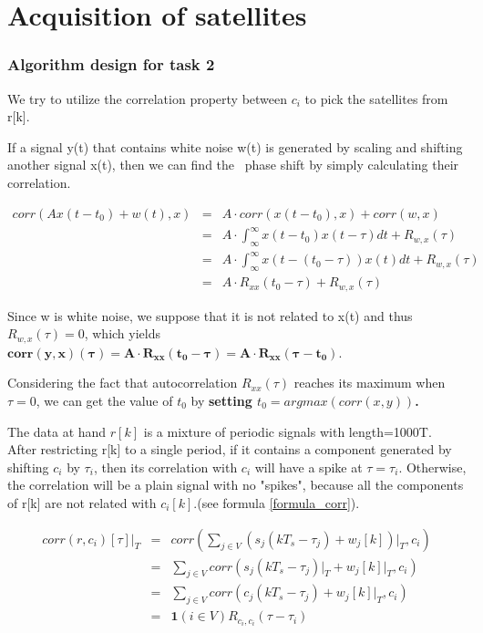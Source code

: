 \documentclass{article}
\begin{document}
\part{\textbf{Acquisition of satellites}}

\section{Algorithm design for task 2}

\par We try to utilize the correlation property between $c_i$ to pick the satellites from r[k].
\par If a signal y(t) that contains white noise w(t) is generated by 
scaling and shifting another signal x(t), then we can find the \
phase shift by simply calculating their correlation.

\begin{eqnarray}
    corr(Ax(t-t_0)+w(t),x) &= &A\cdot corr(x(t-t_0),x)+corr(w,x) \nonumber    \\
    &=& A\cdot \int_{\infty}^{\infty} x(t-t_0)x(t-\tau)dt+R_{w,x}(\tau) \nonumber    \\
    &=& A\cdot \int_{\infty}^{\infty} x(t-(t_0-\tau))x(t)dt+R_{w,x}(\tau) \nonumber    \\
    &=& A\cdot R_{xx}(t_0-\tau)+R_{w,x}(\tau)
\end{eqnarray}

\par Since w is white noise, we suppose that it is not related to x(t) and thus $R_{w,x}(\tau)=0$, which 
yields $\mathbf{corr(y,x)(\tau)=A\cdot R_{xx}(t_0-\tau)=A\cdot R_{xx}(\tau-t_0)}$. 
\par \indent Considering the fact that autocorrelation $R_{xx}(\tau)$ reaches its maximum when $\tau=0$, we can 
get the value of $t_0$ by \textbf{setting $t_0=argmax(corr(x,y))$.}

\par The data at hand $r[k]$ is a mixture of periodic signals with length=1000T.
\\After restricting r[k] to a single period, if it contains a component generated by shifting $c_i$ by $\tau_i$, 
then its correlation with $c_i$ will have a spike at $\tau=\tau_i$.
Otherwise, the correlation will be a plain signal with no "spikes", because all the components of r[k] are
not related with $c_i[k]$.(see formula \ref{formula_corr}).

\begin{eqnarray}
    corr(r,c_i)[\tau]\vert_T&=&corr(\sum_{j\in V} (s_j(kT_s-\tau_j)+w_j[k])\vert_T,c_i)    \nonumber    \\
    &=&\sum_{j\in V} corr(s_j(kT_s-\tau_j)\vert_T+w_j[k]\vert_T,c_i)    \nonumber    \\
    &=&\sum_{j\in V} corr(c_j(kT_s-\tau_j)+w_j[k]\vert_T,c_i)                                    \nonumber    \\
    &=&\mathbf{1}(i\in V) R_{c_i,c_i}(\tau-\tau_i)
\end{eqnarray}
\end{document}
